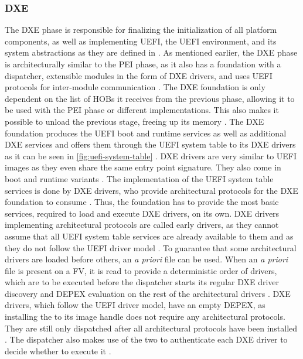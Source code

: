 \subsubsection{\acf{DXE}}

The \ac{DXE} phase is responsible for finalizing the initialization of all platform components, as well as implementing \ac{UEFI}, the \ac{UEFI} environment, and its system abstractions as they are defined in \cite{uefi-spec}.
As mentioned earlier, the \ac{DXE} phase is architecturally similar to the \ac{PEI} phase, as it also has a foundation with a dispatcher, extensible modules in the form of \ac{DXE} drivers, and uses \ac{UEFI} protocols for inter-module communication \citep[Vol. 2, 2.1]{pi-spec}.
The \ac{DXE} foundation is only dependent on the list of \acp{HOB} it receives from the previous phase, allowing it to be used with the \ac{PEI} phase or different implementations.
This also makes it possible to unload the previous stage, freeing up its memory \cite[Vol. 2, 9.1]{pi-spec}.
The \ac{DXE} foundation produces the \ac{UEFI} boot and runtime services as well as additional \ac{DXE} services and offers them through the \ac{UEFI} system table to its \ac{DXE} drivers as it can be seen in \autoref{fig:uefi-system-table} \cite[Vol. 2, 2.2.1]{pi-spec}.
\ac{DXE} drivers are very similar to \ac{UEFI} images as they even share the same entry point signature.
They also come in boot and runtime variants \cite[Vol. 2, 11.2.3]{pi-spec}.
The implementation of the \ac{UEFI} system table services is done by \ac{DXE} drivers, who provide architectural protocols for the \ac{DXE} foundation to consume \cite[Vol. 2, 12.1]{pi-spec}.
Thus, the foundation has to provide the most basic services, required to load and execute \ac{DXE} drivers, on its own.
\ac{DXE} drivers implementing architectural protocols are called early drivers, as they cannot assume that all \ac{UEFI} system table services are already available to them and as they do not follow the \ac{UEFI} driver model \cite[Vol. 2, 11.2.1]{pi-spec}.
To guarantee that some architectural drivers are loaded before others, an \emph{a priori} file can be used.
When an \emph{a priori} file is present on a \ac{FV}, it is read to provide a deterministic order of drivers, which are to be executed before the dispatcher starts its regular \ac{DXE} driver discovery and \ac{DEPEX} evaluation on the rest of the architectural drivers \cite[Vol. 2, 10.3]{pi-spec}.
\ac{DXE} drivers, which follow the \ac{UEFI} driver model, have an empty \ac{DEPEX}, as installing the  to its image handle does not require any architectural protocols.
They are still only dispatched after all architectural protocols have been installed \cite[Vol. 2, 11.2.2]{pi-spec}.
The dispatcher also makes use of the two  to authenticate each \ac{DXE} driver to decide whether to execute it \cite[Vol. 2, 10.13]{pi-spec}.

